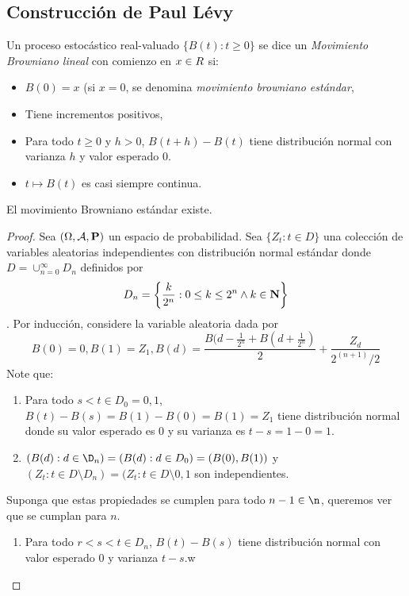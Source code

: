     \subsection{Construcción de Paul Lévy}
    \begin{definition}
        Un proceso estocástico real-valuado \( \{ B(t): t\geq 0 \} \) se dice un \textit{Movimiento Browniano lineal} con comienzo en $x \in \R$ si:
        \begin{itemize}
            \item \(B(0)=x\) (si $x=0$, se denomina \textit{movimiento browniano estándar},
            \item Tiene incrementos positivos,
            \item Para todo $t \geq 0$ y $h>0$, \( B(t+h)-B(t) \) tiene distribución normal con varianza $h$ y valor esperado $0$.
            \item \( t \mapsto B(t) \) es casi siempre continua.
        \end{itemize}
    \end{definition}
    \begin{theorem}
        El movimiento Browniano estándar existe.
    \end{theorem}
    \begin{proof}
        Sea \( (\Omega, \mathcal{A}, \P ) \) un espacio de probabilidad. Sea \( \{Z_t:t \in D \} \) una colección de variables aleatorias independientes con distribución normal estándar donde \(D=\cup_{n=0}^{\infty}D_n \) definidos por 
        \[
            D_n = \left\{ \frac{k}{2^n}: 0\leq k \leq 2^n \wedge k \in \N \right\}
        \].
        Por inducción, considere la variable aleatoria dada por  
        \[
            B(0)=0, B(1)=Z_1, B(d)=\frac{B(d-\frac{1}{2^n}+B(d+\frac{1}{2^n})}{2}+\frac{Z_d}{2^(n+1)/2}
        \]
        Note que:
        \begin{enumerate}[(1)]
            \item Para todo \( s<t \in D_0={0,1} \), \(B(t)-B(s)=B(1)-B(0)=B(1)=Z_1 \) tiene distribución normal donde su valor esperado es 0 y su varianza es \(t-s=1-0=1\).
            \item \((B(d):d\in \D_n )= (B(d):d \in D_0)= (B(0),B(1))\) y \((Z_t: t \in D\setminus D_n )=(Z_t:t\in D\setminus{0,1}\) son independientes.
        \end{enumerate}
        Suponga que estas propiedades se cumplen para todo \( n-1 \in \n \), queremos ver que se cumplan para $n$.
        \begin{enumerate}[(1)]
            \item Para todo \( r<s<t \in D_n \), \(B(t)-B(s)\) tiene distribución normal con valor esperado 0 y varianza \(t-s\).w
        \end{enumerate}
    \end{proof}
    
